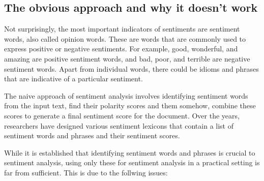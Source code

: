 \subsection{The obvious approach and why it doesn't work}

Not surprisingly, the most important indicators of sentiments are sentiment
words, also called opinion words. These are words that are commonly used
to express positive or negative sentiments. For example, good, wonderful,
and amazing are positive sentiment words, and bad, poor, and terrible are
negative sentiment words. Apart from individual words, there could be idioms and phrases that are indicative of a particular sentiment. \vspace{8mm} 

The naive approach of sentiment analysis involves identifying sentiment words from the input text, find their polarity scores and them somehow, combine these scores to
generate a final sentiment score for the document. Over the years, researchers have designed various sentiment lexicons that contain a list of sentiment words and phrases
and their sentiment scores. \vspace{8mm} 

While it is established that identifying sentiment words and phrases is crucial to sentiment analysis, using only these for sentiment analysis in
a practical setting is far from sufficient. This is due to the follwing issues:

